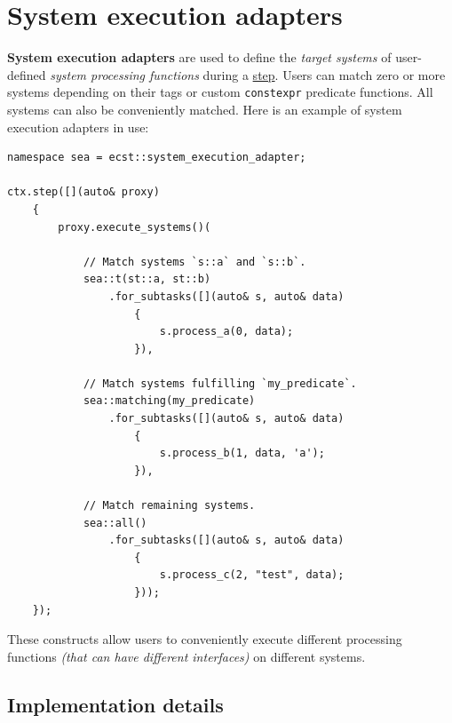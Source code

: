\documentclass[twoside, 12pt, a4paper, openany]{book}
\begin{document}
\section{System execution adapters}\label{system-execution-adapters}

\textbf{System execution adapters} are used to define the \emph{target
systems} of user-defined \emph{system processing functions} during a
\protect\hyperlink{step_stage}{step}. Users can match zero or more
systems depending on their tags or custom
\texttt{constexpr}
predicate functions. All systems can also be conveniently matched. Here
is an example of system execution adapters in use:

\begin{verbatim}
namespace sea = ecst::system_execution_adapter;

ctx.step([](auto& proxy)
    {
        proxy.execute_systems()(

            // Match systems `s::a` and `s::b`.
            sea::t(st::a, st::b)
                .for_subtasks([](auto& s, auto& data)
                    {
                        s.process_a(0, data);
                    }),

            // Match systems fulfilling `my_predicate`.
            sea::matching(my_predicate)
                .for_subtasks([](auto& s, auto& data)
                    {
                        s.process_b(1, data, 'a');
                    }),

            // Match remaining systems.
            sea::all()
                .for_subtasks([](auto& s, auto& data)
                    {
                        s.process_c(2, "test", data);
                    }));
    });
\end{verbatim}

These constructs allow users to conveniently execute different
processing functions \emph{(that can have different interfaces)} on
different systems.

\subsection{Implementation details}\label{implementation-details-2}
\end{document}
